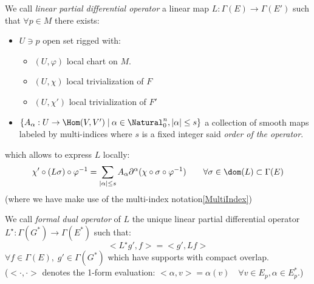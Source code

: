\documentclass[a4paper,10pt,smallheadings]{scrartcl}
\begin{document}
		\begin{definition}\label{Def:LPDO}
			We call \emph{linear partial differential operator} a
			linear map $L:\Gamma(E)\rightarrow \Gamma(E')$ such that $\forall p \in M$ there exists:
		\begin{itemize}
			\item $U \ni p$ open set rigged with:
				\begin{itemize}
					\item $(U, \varphi )$ local chart on $M$.
					\item $(U, \chi)$ local trivialization of $F$
					\item $(U, \chi')$ local trivialization of $F'$
				\end{itemize}
			\item $\{A_\alpha :U \rightarrow \Hom(V,V')\; \vert \: \alpha \in \Natural_0^n, \vert \alpha \vert \leq s \}$
			a collection of smooth maps labeled by multi-indices where $s$ is a fixed integer said \emph{order of the operator}.
		\end{itemize}
		which allows to express $L$ locally:
		\begin{displaymath}
			\chi' \circ ( L \sigma) \circ \varphi^{-1} =
			\sum_{\vert \alpha \vert \leq s} A_\alpha \partial^\alpha (\chi \circ \sigma \circ \varphi^{-1} )
			\qquad \forall \sigma \in \dom(L) \subset \Gamma(E)
		\end{displaymath}
		(where we have make use of the multi-index notation\ref{MultiIndex})
	\end{definition}
				\begin{definition}
				We call \emph{formal dual operator} of $L$
				the unique linear partial differential operator $L^\star: \Gamma(G^*) \rightarrow \Gamma(E^*)$ such that:
				\begin{displaymath}
					<L^\star g' , f > = <g', L f>
				\end{displaymath}
				$\forall f\in \Gamma(E),\; g' \in \Gamma(G^*)$ which have supports with compact overlap.
				\\
				($<\cdot,\cdot>$ denotes the 1-form evaluation: $<\alpha,v>= \alpha(v) \quad \forall v\in E_p, \alpha \in E^*_p$.)
			\end{definition}
\end{document}
